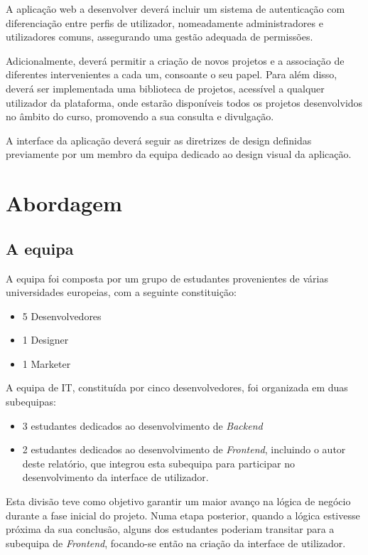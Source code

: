 A aplicação web a desenvolver deverá incluir um sistema de autenticação com diferenciação entre perfis de utilizador, nomeadamente administradores e utilizadores comuns, assegurando uma gestão adequada de permissões. 

Adicionalmente, deverá permitir a criação de novos projetos e a associação de diferentes intervenientes a cada um, consoante o seu papel. Para além disso, deverá ser implementada uma biblioteca de projetos, acessível a qualquer utilizador da plataforma, onde estarão disponíveis todos os projetos desenvolvidos no âmbito do curso, promovendo a sua consulta e divulgação.

A interface da aplicação deverá seguir as diretrizes de design definidas previamente por um membro da equipa dedicado ao design visual da aplicação.


\section{Abordagem}

\subsection{A equipa}

A equipa foi composta por um grupo de estudantes provenientes de várias universidades europeias, com a seguinte constituição:

\begin{itemize}
    \item 5 Desenvolvedores
    \item 1 Designer
    \item 1 Marketer
\end{itemize}

A equipa de IT, constituída por cinco desenvolvedores, foi organizada em duas subequipas: 
\begin{itemize}
    \item 3 estudantes dedicados ao desenvolvimento de \textit{Backend}
    \item 2 estudantes dedicados ao desenvolvimento de \textit{Frontend}, incluindo o autor deste relatório, que integrou esta subequipa para participar no desenvolvimento da interface de utilizador.
\end{itemize}

Esta divisão teve como objetivo garantir um maior avanço na lógica de negócio durante a fase inicial do projeto. 
Numa etapa posterior, quando a lógica estivesse próxima da sua conclusão, alguns dos estudantes poderiam transitar para a subequipa de \textit{Frontend}, focando-se então na criação da interface de utilizador.

